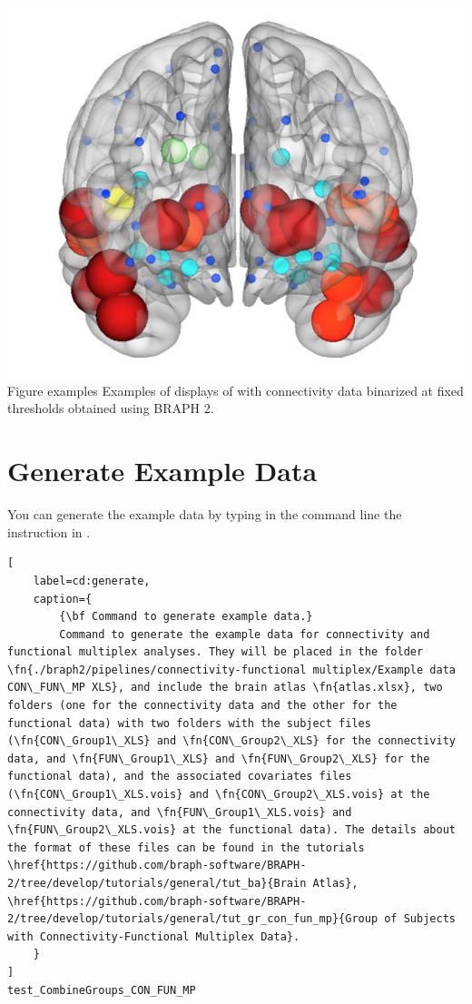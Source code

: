 \documentclass[justified]{tufte-handout}
\begin{document}
{	\includegraphics{fig01_03.jpg}
	}
	{Figure examples}
	{
	Examples of displays of  with connectivity data binarized at fixed thresholds obtained using BRAPH 2.
	}
	
\tableofcontents

\clearpage
\section{Generate Example Data}

You can generate the example data by typing in the command line the instruction in .
%
\begin{lstlisting}[
	label=cd:generate,
	caption={
		{\bf Command to generate example data.}
		Command to generate the example data for connectivity and functional multiplex analyses. They will be placed in the folder \fn{./braph2/pipelines/connectivity-functional multiplex/Example data CON\_FUN\_MP XLS}, and include the brain atlas \fn{atlas.xlsx}, two folders (one for the connectivity data and the other for the functional data) with two folders with the subject files (\fn{CON\_Group1\_XLS} and \fn{CON\_Group2\_XLS} for the connectivity data, and \fn{FUN\_Group1\_XLS} and \fn{FUN\_Group2\_XLS} for the functional data), and the associated covariates files (\fn{CON\_Group1\_XLS.vois} and \fn{CON\_Group2\_XLS.vois} at the connectivity data, and \fn{FUN\_Group1\_XLS.vois} and \fn{FUN\_Group2\_XLS.vois} at the functional data). The details about the format of these files can be found in the tutorials \href{https://github.com/braph-software/BRAPH-2/tree/develop/tutorials/general/tut_ba}{Brain Atlas}, \href{https://github.com/braph-software/BRAPH-2/tree/develop/tutorials/general/tut_gr_con_fun_mp}{Group of Subjects with Connectivity-Functional Multiplex Data}.
	}
]
test_CombineGroups_CON_FUN_MP
\end{lstlisting}
\end{document}
